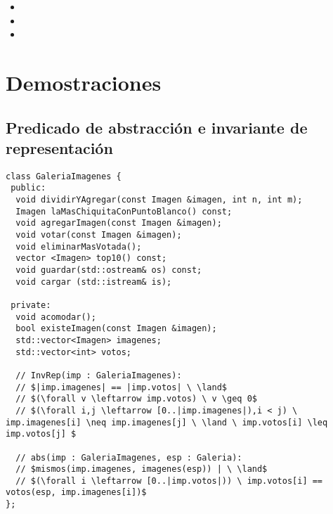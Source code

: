 \documentclass[10pt,a4paper,spanish]{article}
\begin{document}
\begin{itemize}
	\item {}

	\item {}

	\item \auxil{listaVotosOrdenados(g: Galeria, imgs: [Imagen]) : [\ent]}{ \newline
	  [votos(g,im) \ | \ i \leftarrow [0..|imgs|),im \leftarrow imgs, cuentaMasVotos(g,imgs,im)==i]
	}

\end{itemize}

\section{Demostraciones}

\subsection{Predicado de abstracción e invariante de representación}

\begin{lstlisting}
class GaleriaImagenes {
 public:
  void dividirYAgregar(const Imagen &imagen, int n, int m);
  Imagen laMasChiquitaConPuntoBlanco() const;
  void agregarImagen(const Imagen &imagen);
  void votar(const Imagen &imagen);
  void eliminarMasVotada();
  vector <Imagen> top10() const;
  void guardar(std::ostream& os) const;
  void cargar (std::istream& is);

 private:
  void acomodar();
  bool existeImagen(const Imagen &imagen);
  std::vector<Imagen> imagenes;
  std::vector<int> votos;

  // InvRep(imp : GaleriaImagenes):
  // $|imp.imagenes| == |imp.votos| \ \land$
  // $(\forall v \leftarrow imp.votos) \ v \geq 0$
  // $(\forall i,j \leftarrow [0..|imp.imagenes|),i < j) \ imp.imagenes[i] \neq imp.imagenes[j] \ \land \ imp.votos[i] \leq imp.votos[j] $

  // abs(imp : GaleriaImagenes, esp : Galeria):
  // $mismos(imp.imagenes, imagenes(esp)) | \ \land$
  // $(\forall i \leftarrow [0..|imp.votos|)) \ imp.votos[i] == votos(esp, imp.imagenes[i])$
};
\end{lstlisting}
\end{document}
